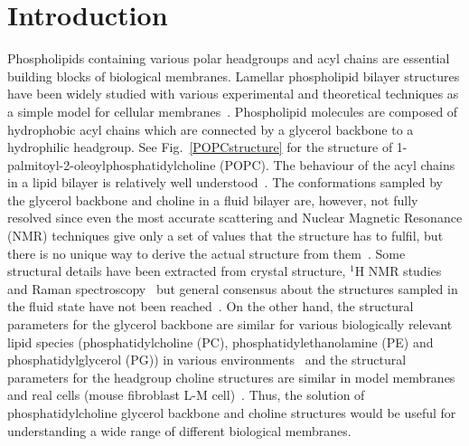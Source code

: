 \documentclass[journal=jacsat,manuscript=article]{achemso}
\begin{document}


\section{Introduction}

Phospholipids containing various polar headgroups and acyl chains are essential building blocks of 
biological membranes. Lamellar phospholipid bilayer structures have been widely studied with various experimental 
and theoretical techniques as a simple model for cellular membranes~\cite{lipowsky95,tieleman97,klauda08,edholm08,tieleman10,piggot12,rabinovich13,marsh13}. 
Phospholipid molecules are composed of hydrophobic acyl chains which are connected by a glycerol backbone to a hydrophilic headgroup.
See Fig.~\ref{POPCstructure} for the structure of 1-palmitoyl-2-oleoylphosphatidylcholine (POPC).
The behaviour of the acyl chains in a lipid bilayer is relatively well understood~\cite{Israelachvili80,lipowsky95,tieleman97,klauda08,edholm08,tieleman10,marsh13}. 
The conformations sampled by the glycerol backbone and choline in a fluid bilayer are, however, not fully 
resolved since even the most accurate scattering and Nuclear Magnetic Resonance (NMR)
techniques give only a set of values that the structure has to fulfil, but
there is no unique way to derive the actual structure from them~\cite{seelig77b,skarjune79,Israelachvili80,jacobs80,davis83,strenk85,akutsu91,hong95b,hong96,semchyschyn04}.
Some structural details have been extracted from crystal structure, $^1$H NMR studies and Raman spectroscopy~\cite{hauser80,hauser81,hauser81b,akutsu81b,pascher92,hauser88,marsh06}
but general consensus about the structures sampled in the fluid state have not been reached~\cite{seelig77b,skarjune79,Israelachvili80,jacobs80,davis83,strenk85,hauser88,akutsu91,hong95b,hong96,semchyschyn04,marsh06}. 
On the other hand, the structural parameters for the glycerol backbone are similar for various biologically
relevant lipid species (phosphatidylcholine (PC), phosphatidylethanolamine (PE) and phosphatidylglycerol (PG)) 
in various environments~\cite{gally81} and the structural parameters for the headgroup choline structures are similar in model membranes and
real cells (mouse fibroblast L-M cell)~\cite{scherer87}.
Thus, the solution of phosphatidylcholine glycerol backbone and choline structures would be 
useful for understanding a wide range of different biological membranes.
\end{document}

